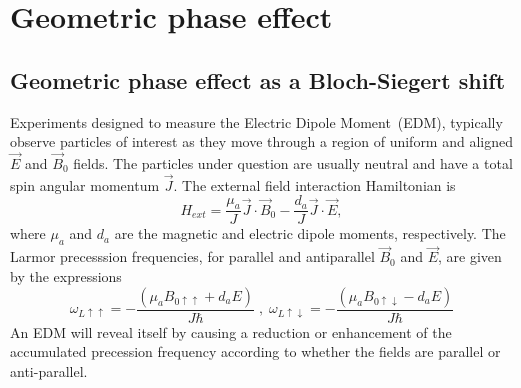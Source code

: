 \chapter{Geometric phase effect\label{app:GPE}}

\section{Geometric phase effect as a Bloch-Siegert shift}

Experiments designed to measure the Electric Dipole Moment~(EDM),
typically observe particles of interest as they move through a region
of uniform and aligned $\vec{E}$ and $\vec{B}_0$ fields. The
particles under question are usually neutral and have a total spin
angular momentum $\vec{J}$. The external field interaction
Hamiltonian is
%
\begin{equation}
H_{ext} = \frac{\mu_a}{J}\vec{J}\cdot\vec{B}_0 - \frac{d_a}{J}\vec{J}\cdot\vec{E},
\end{equation}
%
where $\mu_a$ and $d_a$ are the magnetic and electric dipole moments,
respectively.
The Larmor precesssion frequencies, for parallel and antiparallel
$\vec{B}_0$ and $\vec{E}$, are given by the expressions
%
\begin{equation}
\label{eqn:GPEw}
\omega_{L\uparrow\uparrow} = -\frac{(\mu_a B_{0\uparrow\uparrow} + d_a E)}{J\hbar} \; , \; \omega_{L\uparrow\downarrow} = -\frac{(\mu_a B_{0\uparrow\downarrow} - d_a E)}{J\hbar} 
\end{equation}
%
An EDM will reveal itself by causing a reduction or enhancement of the
accumulated precession frequency according to whether the fields are
parallel or anti-parallel.

